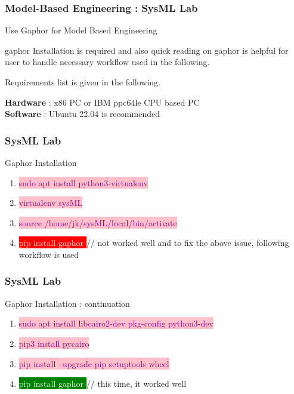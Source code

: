 

\begin{frame}
\frametitle{Model-Based Engineering : SysML Lab}
\begin{block}{Use Gaphor  for Model Based Engineering }

 gaphor Installation  is  required and also quick reading on gaphor is helpful for user to handle necessary workflow used in the following. 
 
 \vspace{1cm}
 Requirements list is given in the following.
 
 { \bf Hardware } :  x86 PC or IBM ppc64le CPU based PC  \\
 { \bf Software } : Ubuntu 22.04 is recommended 

 \end{block}
\end{frame}

\newpage
\begin{frame}
\frametitle{SysML Lab}
\begin{block}{Gaphor Installation }
\begin{enumerate}
\item   \colorbox{pink}{ \textcolor{purple}{sudo apt install python3-virtualenv  } }
\item   \colorbox{pink}{ \textcolor{purple}{virtualenv sysML } }
\item   \colorbox{pink}{ \textcolor{purple}{source /home/jk/sysML/local/bin/activate } }
\item \colorbox{red}{ \textcolor{white}{pip install gaphor } } 
 // not worked well and to fix the above issue, following workflow is used 
\end{enumerate}
\end{block}
\end{frame}


\newpage
\begin{frame}
\frametitle{SysML Lab}
\begin{block}{Gaphor Installation : continuation }
\begin{enumerate}
\item  \colorbox{pink}{ \textcolor{purple}{sudo apt install libcairo2-dev pkg-config python3-dev } }
\item  \colorbox{pink}{ \textcolor{purple}{pip3 install pycairo } }
\item   \colorbox{pink}{ \textcolor{purple}{pip install --upgrade pip setuptools wheel } }
\item    \colorbox{green}{ \textcolor{white}{pip install gaphor  } }
// this time, it worked well
\end{enumerate}
\end{block}
\end{frame}

